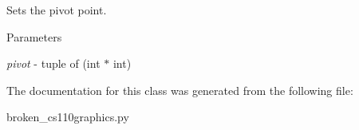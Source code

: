 Sets the pivot point. 
\begin{DoxyParams}{Parameters}
\item[{\em pivot}]-\/ tuple of (int $\ast$ int) \end{DoxyParams}


The documentation for this class was generated from the following file:\begin{DoxyCompactItemize}
\item 
broken\_\-cs110graphics.py\end{DoxyCompactItemize}
